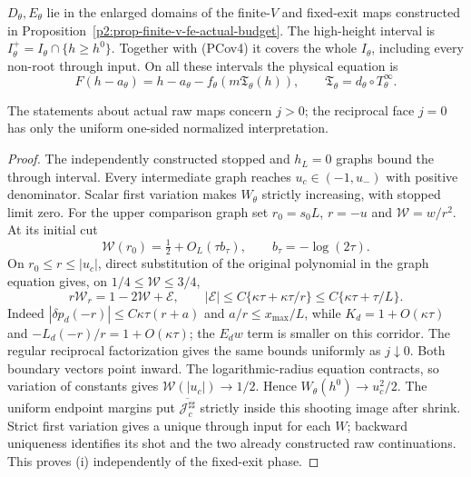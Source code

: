 \begin{proposition}
\begin{enumerate}
$D_\theta,E_\theta$ lie in the enlarged domains of the finite-$V$ and
fixed-exit maps constructed in
Proposition~\ref{p2:prop-finite-v-fe-actual-budget}.
The high-height interval is $I_\theta^+=I_\theta\cap\{h\ge h^0\}$.
Together with (PCov4) it covers the whole $I_\theta$, including every
non-root through input. On all these intervals the physical equation is
\[
 F(h-a_\theta)=h-a_\theta-f_\theta(m\mathfrak T_\theta(h)),
 \qquad \mathfrak T_\theta=d_\theta\circ T_\theta^\infty.
 \tag{PCov6}
\]
\end{enumerate}
The statements about actual raw maps concern $j>0$; the reciprocal
face $j=0$ has only the uniform one-sided normalized interpretation.
\end{proposition}
\begin{proof}
The independently constructed stopped and $h_L=0$ graphs bound the
through interval. Every intermediate graph reaches $u_c\in(-1,u_-)$ with
positive denominator. Scalar first variation makes $W_\theta$ strictly
increasing, with stopped limit zero.
For the upper comparison graph set $r_0=s_0L$, $r=-u$ and $\mathscr W=w/r^2$.
At its initial cut
\[
 \mathscr W(r_0)=\tfrac12+O_L(\tau b_\tau),\qquad
 b_\tau=-\log(2\tau).
\]
On $r_0\le r\le |u_c|$, direct substitution of the original polynomial
in the graph equation gives, on $1/4\le\mathscr W\le3/4$,
\[
 r\mathscr W_r=1-2\mathscr W+\mathscr E,\qquad
 |\mathscr E|\le C\{\kappa\tau+\kappa\tau/r\}
                 \le C\{\kappa\tau+\tau/L\}.             \tag{PCov7}
\]
Indeed $|\delta p_d(-r)|\le C\kappa\tau(r+a)$ and
$a/r\le x_{\max}/L$, while $K_d=1+O(\kappa\tau)$ and
$-L_d(-r)/r=1+O(\kappa\tau)$; the $E_dw$ term is smaller on this
corridor. The regular reciprocal factorization gives the same bounds
uniformly as $j\downarrow0$. Both boundary vectors point inward.
The logarithmic-radius equation contracts, so variation of constants
gives $\mathscr W(|u_c|)\to1/2$. Hence
$W_\theta(h^0)\to u_c^2/2$. The uniform endpoint margins put
$\overline{\mathcal J_c^{\sharp\sharp}}$ strictly inside this shooting
image after shrink. Strict first variation gives a unique through input
for each $W$; backward uniqueness identifies its shot and the two
already constructed raw continuations. This proves (i) independently
of the fixed-exit phase.


\end{proof}

